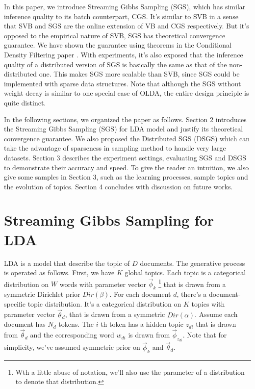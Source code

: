 \documentclass{article} %
\begin{document}
In this paper, we introduce Streaming Gibbs Sampling (SGS), which has similar inference quality to its batch counterpart, CGS. It's similar to SVB in a sense that SVB and SGS are the online extension of VB and CGS respectively. But it's opposed to the empirical nature of SVB, SGS has theoretical convergence guarantee. We have shown the guarantee using theorems in the Conditional Density Filtering paper \cite{guhaniyogi2014bayesian}. With experiments, it's also exposed that the inference quality of a distributed version of SGS is basically the same as that of the non-distributed one. This makes SGS more scalable than SVB, since SGS could be implemented with sparse data structures. Note that although the SGS without weight decay is similar to one special case of OLDA, the entire design principle is quite distinct.

In the following sections, we organized the paper as follows. Section 2 introduces the Streaming Gibbs Sampling (SGS) for LDA model and justify its theoretical convergence guarantee. We also proposed the Distributed SGS (DSGS) which can take the advantage of sparseness in sampling method to handle very large datasets. Section 3 describes the experiment settings, evaluating SGS and DSGS to demonstrate their accuracy and speed. To give the reader an intuition, we also give some samples in Section 3, such as the learning processes, sample topics and the evolution of topics. Section 4 concludes with discussion on future works. 



\section{Streaming Gibbs Sampling for LDA} 
 
LDA is a model that describe the topic of $D$ documents. The generative process is operated as follows. First, we have $K$ global topics. Each topic is a categorical distribution on $W$ words with parameter vector $\vec{\phi}_k$ \footnote{Wth a little abuse of notation, we'll also use the parameter of a distribution to denote that distribution.} that is drawn from a symmetric Dirichlet prior $Dir(\beta)$. For each document $d$, there's a document-specific topic distribution. It's a categorical distribution on $K$ topics with parameter vector  $\vec{\theta}_d$, that is drawn from a symmetric $Dir(\alpha)$. Assume each document has $N_d$ tokens. The $i$-th token has a hidden topic $z_{di}$ that is drawn from $\vec{\theta}_d$ and the corresponding word $w_{di}$ is drawn from $\vec{\phi}_{z_{di}}$. Note that for simplicity, we've assumed symmetric prior on $\vec{\phi}_k$ and $\vec{\theta}_d$. 
\end{document}
